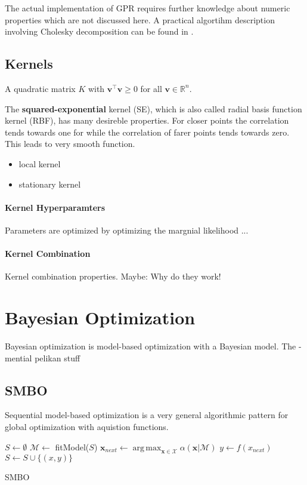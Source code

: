 \documentclass[english]{article}
\newcommand{\x}{\mathbf{x}}
\newcommand{\M}{\mathcal{M}}
\newcommand{\X}{\mathcal{X}}
\DeclareMathOperator*{\argmax}{arg\,max}
\begin{document}
The actual implementation of \ac{GPR} requires further knowledge about numeric properties which are not discussed here. A practical algortihm description involving Cholesky decomposition can be found in \cite[Algorithm 2.1]{rasmussen_gaussian_2006}.




\subsection{Kernels}
A quadratic matrix $K$ with $\mathbf{v}^\top \mathbf{v} \ge 0$ for all $\mathbf{v} \in \mathbb{R}^n$.

The \textbf{squared-exponential} kernel (SE), which is also called radial basis function kernel (RBF), has many desireble properties. For closer points the correlation tends towards one for while the correlation of farer points tends towards zero. This leads to very smooth function.

\begin{itemize}
  \item local kernel
  \item stationary kernel
\end{itemize}

\paragraph{Kernel Hyperparamters}
Parameters are optimized by optimizing the margnial likelihood ...

\paragraph{Kernel Combination}
Kernel combination properties. Maybe: Why do they work!



\section{Bayesian Optimization}
Bayesian optimization is model-based optimization with a Bayesian model. The
- mential pelikan stuff

\subsection{SMBO}
Sequential model-based optimization is a very general algorithmic pattern for global optimization with aquistion functions.

\begin{algorithm}[H]
\SetAlgoLined

$S \leftarrow \emptyset$\;
{
  $\mathcal{M} \leftarrow$ fitModel($S$)\;
  $\x_{next} \leftarrow \argmax_{\x \in \X} \alpha(\x|\M)$\;
  $y \leftarrow f(x_{next})$\;
  $S \leftarrow S \cup \{(x,y)\}$\;
}
\caption{SMBO}
\end{algorithm}
\end{document}
